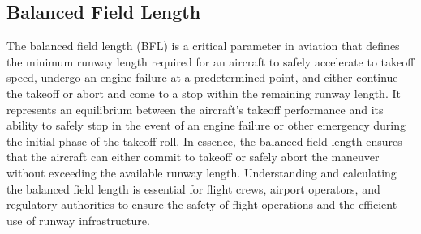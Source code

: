 \subsection{Balanced Field Length}
The balanced field length (BFL) is a critical parameter in aviation that defines the minimum runway length required for an aircraft to safely accelerate to takeoff speed, undergo an engine failure at a predetermined point, and either continue the takeoff or abort and come to a stop within the remaining runway length. It represents an equilibrium between the aircraft's takeoff performance and its ability to safely stop in the event of an engine failure or other emergency during the initial phase of the takeoff roll. In essence, the balanced field length ensures that the aircraft can either commit to takeoff or safely abort the maneuver without exceeding the available runway length. Understanding and calculating the balanced field length is essential for flight crews, airport operators, and regulatory authorities to ensure the safety of flight operations and the efficient use of runway infrastructure.
